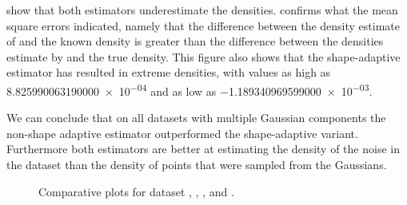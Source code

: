 	 show that both estimators underestimate the densities.  confirms what the mean square errors indicated, namely that the difference between the density estimate of \sambe and the known density is greater than the difference between the densities estimate by \mbe and the true density. This figure also shows that the shape-adaptive estimator has resulted in extreme densities, with values as high as \num{8.825990063190000e-04} and as low as \num{-1.189340969599000e-03}.

	We can conclude that on all datasets with multiple Gaussian components the non-shape adaptive estimator outperformed the shape-adaptive variant. Furthermore both estimators are better at estimating the density of the noise in the dataset than the density of points that were sampled from the Gaussians. 

\begin{figure*}
	\centering
	
	\caption{Comparative plots for dataset \ferdosiTwoNum, \ferdosiThreeNum, \baakmanTwoNum, and \baakmanThreeNum.}
	\label{fig:4:resuts:multiSphere}
\end{figure*}